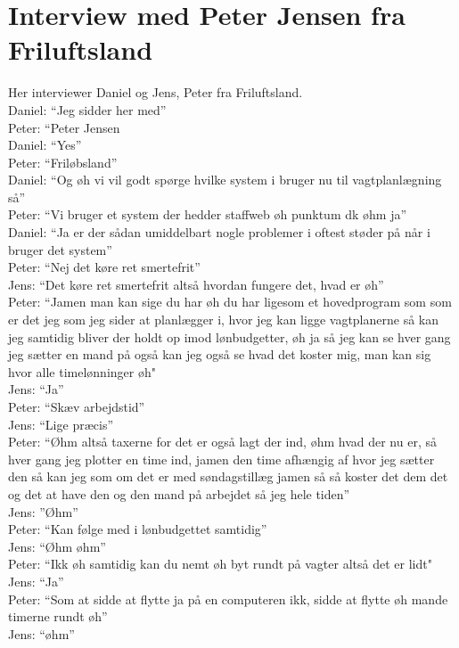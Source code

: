 \section{Interview med Peter Jensen fra Friluftsland} \label{app:friluftsland}
Her interviewer Daniel og Jens, Peter fra Friluftsland.\\
Daniel: “Jeg sidder her med”\\
Peter: “Peter Jensen\\
Daniel: “Yes”\\
Peter: “Friløbsland” \\
Daniel: “Og øh vi vil godt spørge hvilke system i bruger nu til vagtplanlægning så”\\
Peter: “Vi bruger et system der hedder staffweb øh punktum dk øhm ja”\\
Daniel: “Ja er der sådan umiddelbart nogle problemer i oftest støder på når i bruger det system”\\
Peter: “Nej det køre ret smertefrit” \\
Jens: “Det køre ret smertefrit altså hvordan fungere det, hvad er øh”\\
Peter: “Jamen man kan sige du har øh du har ligesom et hovedprogram som som er det jeg  som jeg sider at planlægger i, hvor jeg kan ligge vagtplanerne så kan jeg samtidig bliver der holdt op imod lønbudgetter, øh ja så jeg kan se hver gang jeg sætter en mand på også kan jeg også se hvad det koster mig, man kan sig hvor alle timelønninger øh"\\
Jens: “Ja”\\
Peter: “Skæv arbejdstid”\\
Jens: “Lige præcis”\\
Peter: “Øhm altså taxerne for det er også lagt der ind, øhm hvad der nu er, så hver gang jeg plotter en time ind, jamen den time afhængig af hvor jeg sætter den så kan jeg som om det er med søndagstillæg jamen så så koster det dem det og det at have den og den mand på arbejdet så jeg hele tiden”\\
Jens: ”Øhm”\\
Peter: “Kan følge med i lønbudgettet samtidig”\\
Jens: “Øhm øhm”\\
Peter: “Ikk øh samtidig kan du nemt øh byt rundt på vagter altså det er lidt"\\
Jens: “Ja”\\
Peter: “Som at sidde at flytte ja på en computeren ikk, sidde at flytte øh mande timerne rundt øh”\\
Jens: “øhm”\\
